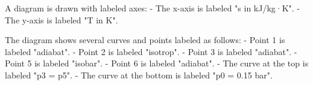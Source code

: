 A diagram is drawn with labeled axes:  
- The x-axis is labeled "s in kJ/kg·K".  
- The y-axis is labeled "T in K".  

The diagram shows several curves and points labeled as follows:  
- Point 1 is labeled "adiabat".  
- Point 2 is labeled "isotrop".  
- Point 3 is labeled "adiabat".  
- Point 5 is labeled "isobar".  
- Point 6 is labeled "adiabat".  
- The curve at the top is labeled "p3 = p5".  
- The curve at the bottom is labeled "p0 = 0.15 bar".